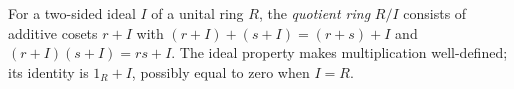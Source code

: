 
For a two-sided ideal $I$ of a unital ring $R$, the \emph{quotient ring} $R/I$ consists of additive cosets $r+I$ with $(r+I)+(s+I)=(r+s)+I$ and $(r+I)(s+I)=rs+I$. The ideal property makes multiplication well-defined; its identity is $1_R+I$, possibly equal to zero when $I=R$.
